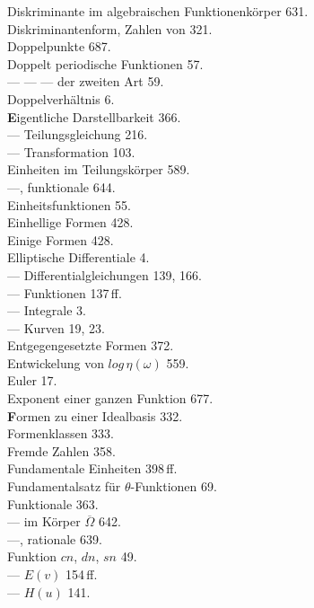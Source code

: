 
\noindent
\begin{minipage}[t]{0.48\textwidth}
\noindent
Diskriminante im algebraischen Funktionenkörper 631. \\
Diskriminantenform, Zahlen von 321. \\
Doppelpunkte 687. \\
Doppelt periodische Funktionen 57. \\
--- --- --- der zweiten Art 59. \\
Doppelverhältnis 6. \\[4pt]
\textbf{E}igentliche Darstellbarkeit 366. \\
--- Teilungsgleichung 216. \\
--- Transformation 103. \\
Einheiten im Teilungskörper 589. \\
---, funktionale 644. \\
Einheitsfunktionen 55. \\
Einhellige Formen 428. \\
Einige Formen 428. \\
Elliptische Differentiale 4. \\
--- Differentialgleichungen 139, 166. \\
--- Funktionen  137\,ff. \\
--- Integrale 3. \\
--- Kurven 19, 23. \\
Entgegengesetzte Formen 372. \\
Entwickelung von $\mathit{log}\,\eta(\omega)$ 559. \\
Euler 17. \\
Exponent einer ganzen Funktion 677. \\[4pt]
\textbf{F}ormen zu einer Idealbasis 332. \\
Formenklassen 333. \\
Fremde Zahlen 358. \\
Fundamentale Einheiten 398\,ff. \\
Fundamentalsatz für $\theta$-Funktionen 69. \\
Funktionale 363. \\
--- im Körper $\overline{\Omega}$ 642. \\
---, rationale 639. \\
Funktion $cn$, $dn$, $sn$ 49. \\
--- $E(v)$ 154\,ff. \\
--- $H(u)$ 141. \\

\end{minipage}
